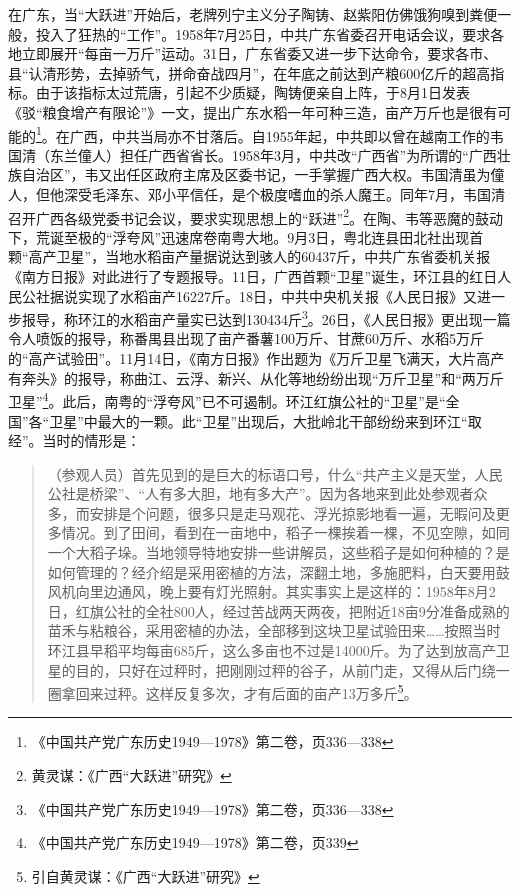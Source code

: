 在广东，当“大跃进”开始后，老牌列宁主义分子陶铸、赵紫阳仿佛饿狗嗅到粪便一般，投入了狂热的“工作”。1958年7月25日，中共广东省委召开电话会议，要求各地立即展开“每亩一万斤”运动。31日，广东省委又进一步下达命令，要求各市、县“认清形势，去掉骄气，拼命奋战四月”，在年底之前达到产粮600亿斤的超高指标。由于该指标太过荒唐，引起不少质疑，陶铸便亲自上阵，于8月1日发表《驳“粮食增产有限论”》一文，提出广东水稻一年可种三造，亩产万斤也是很有可能的\footnote{《中国共产党广东历史1949—1978》第二卷，页336—338}。在广西，中共当局亦不甘落后。自1955年起，中共即以曾在越南工作的韦国清（东兰僮人）担任广西省省长。1958年3月，中共改“广西省”为所谓的“广西壮族自治区”，韦又出任区政府主席及区委书记，一手掌握广西大权。韦国清虽为僮人，但他深受毛泽东、邓小平信任，是个极度嗜血的杀人魔王。同年7月，韦国清召开广西各级党委书记会议，要求实现思想上的“跃进”\footnote{黄灵谋：《广西“大跃进”研究》}。在陶、韦等恶魔的鼓动下，荒诞至极的“浮夸风”迅速席卷南粤大地。9月3日，粤北连县田北社出现首颗“高产卫星”，当地水稻亩产量据说达到骇人的60437斤，中共广东省委机关报《南方日报》对此进行了专题报导。11日，广西首颗“卫星”诞生，环江县的红日人民公社据说实现了水稻亩产16227斤。18日，中共中央机关报《人民日报》又进一步报导，称环江的水稻亩产量实已达到130434斤\footnote{《中国共产党广东历史1949—1978》第二卷，页336—338}。26日，《人民日报》更出现一篇令人喷饭的报导，称番禺县出现了亩产番薯100万斤、甘蔗60万斤、水稻5万斤的“高产试验田”。11月14日，《南方日报》作出题为《万斤卫星飞满天，大片高产有奔头》的报导，称曲江、云浮、新兴、从化等地纷纷出现“万斤卫星”和“两万斤卫星”\footnote{《中国共产党广东历史1949—1978》第二卷，页339}。此后，南粤的“浮夸风”已不可遏制。环江红旗公社的“卫星”是“全国”各“卫星”中最大的一颗。此“卫星”出现后，大批岭北干部纷纷来到环江“取经”。当时的情形是：

\begin{quote}

（参观人员）首先见到的是巨大的标语口号，什么“共产主义是天堂，人民公社是桥梁”、“人有多大胆，地有多大产”。因为各地来到此处参观者众多，而安排是个问题，很多只是走马观花、浮光掠影地看一遍，无暇问及更多情况。到了田间，看到在一亩地中，稻子一棵挨着一棵，不见空隙，如同一个大稻子垛。当地领导特地安排一些讲解员，这些稻子是如何种植的？是如何管理的？经介绍是采用密植的方法，深翻土地，多施肥料，白天要用鼓风机向里边通风，晚上要有灯光照射。其实事实上是这样的：1958年8月2日，红旗公社的全社800人，经过苦战两天两夜，把附近18亩9分准备成熟的苗禾与粘粮谷，采用密植的办法，全部移到这块卫星试验田来……按照当时环江县早稻平均每亩685斤，这么多亩也不过是14000斤。为了达到放高产卫星的目的，只好在过秤时，把刚刚过秤的谷子，从前门走，又得从后门绕一圈拿回来过秤。这样反复多次，才有后面的亩产13万多斤\footnote{引自黄灵谋：《广西“大跃进”研究》}。

\end{quote}

